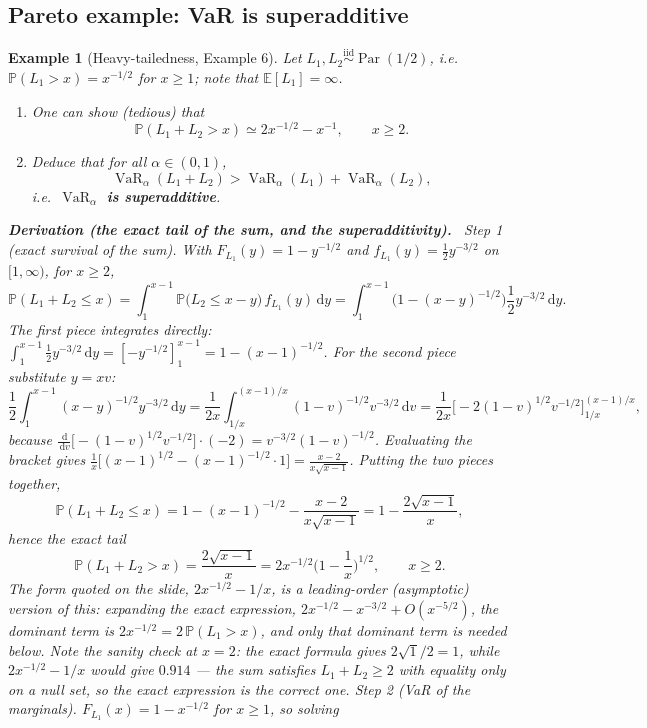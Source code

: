 \documentclass[11pt,a4paper]{article}
\newtheorem{example}{Example}
\newcommand{\VaR}{\operatorname{VaR}}
\newcommand{\Par}{\operatorname{Par}}
\newcommand{\E}{\mathbb{E}}
\renewcommand{\P}{\mathbb{P}}
\newcommand{\dd}{\,\mathrm{d}}
\newcommand{\der}[1]{\medskip\noindent\textbf{Derivation (#1).}\ }
\begin{document}
\subsection{Pareto example: VaR is superadditive}
\begin{example}[Heavy-tailedness, Example 6]
Let $L_1,L_2\stackrel{\text{iid}}{\sim}\Par(1/2)$, i.e.\ $\P(L_1>x)=x^{-1/2}$ for $x\ge1$; note that
$\E[L_1]=\infty$.
\begin{enumerate}[label=\arabic*),leftmargin=*]
  \item One can show (tedious) that
        \[
          \P(L_1+L_2>x)\simeq 2x^{-1/2}-x^{-1},\qquad x\ge2 .
        \]
  \item Deduce that for all $\alpha\in(0,1)$,
        \[
          \VaR_\alpha(L_1+L_2)>\VaR_\alpha(L_1)+\VaR_\alpha(L_2),
        \]
        i.e.\ \textbf{$\VaR_\alpha$ is superadditive}.
\end{enumerate}
\der{the exact tail of the sum, and the superadditivity}
\emph{Step 1 (exact survival of the sum).} With $F_{L_1}(y)=1-y^{-1/2}$ and
$f_{L_1}(y)=\frac12y^{-3/2}$ on $[1,\infty)$, for $x\ge2$,
\[
  \P(L_1+L_2\le x)=\int_1^{x-1}\P\big(L_2\le x-y\big)\,f_{L_1}(y)\dd y
   =\int_1^{x-1}\Big(1-(x-y)^{-1/2}\Big)\frac12y^{-3/2}\dd y .
\]
The first piece integrates directly: $\int_1^{x-1}\frac12y^{-3/2}\dd y=[-y^{-1/2}]_1^{x-1}
=1-(x-1)^{-1/2}$. For the second piece substitute $y=xv$:
\[
  \frac12\int_1^{x-1}(x-y)^{-1/2}y^{-3/2}\dd y
  =\frac{1}{2x}\int_{1/x}^{(x-1)/x}(1-v)^{-1/2}v^{-3/2}\dd v
  =\frac{1}{2x}\Big[-2(1-v)^{1/2}v^{-1/2}\Big]_{1/x}^{(x-1)/x},
\]
because $\frac{\dd}{\dd v}\big[-(1-v)^{1/2}v^{-1/2}\big]\cdot(-2)
=v^{-3/2}(1-v)^{-1/2}$. Evaluating the bracket gives
$\frac{1}{x}\big[(x-1)^{1/2}-(x-1)^{-1/2}\cdot1\big]
=\frac{x-2}{x\sqrt{x-1}}$. Putting the two pieces together,
\[
  \P(L_1+L_2\le x)=1-(x-1)^{-1/2}-\frac{x-2}{x\sqrt{x-1}}
    =1-\frac{2\sqrt{x-1}}{x},
\]
hence the exact tail
\[
  \boxed{\ \P(L_1+L_2>x)=\frac{2\sqrt{x-1}}{x}=2x^{-1/2}\Big(1-\frac1x\Big)^{1/2},\qquad x\ge2.\ }
\]
The form quoted on the slide, $2x^{-1/2}-1/x$, is a leading-order (asymptotic) version of this:
expanding the exact expression, $2x^{-1/2}-x^{-3/2}+O(x^{-5/2})$, the dominant term is
$2x^{-1/2}=2\,\P(L_1>x)$, and only that dominant term is needed below. Note the sanity check at
$x=2$: the exact formula gives $2\sqrt1/2=1$, while $2x^{-1/2}-1/x$ would give $0.914$ --- the sum
satisfies $L_1+L_2\ge2$ with equality only on a null set, so the exact expression is the correct one.
\emph{Step 2 (VaR of the marginals).} $F_{L_1}(x)=1-x^{-1/2}$ for $x\ge1$, so solving

\end{example}
\end{document}
